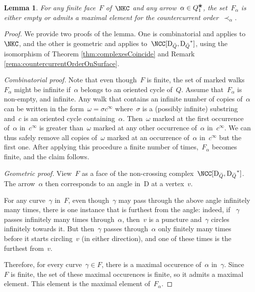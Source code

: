 \documentclass{amsart}
\newtheorem{lemma}[theorem]{Lemma}
\theoremstyle{definition}
\newcommand{\blossom}{^\text{\ding{96}}} %
\newcommand{\dual}{^*} %
\newcommand{\dissection}{\mathrm{D}} %
\begin{document}
\begin{lemma}
\label{lemm:facesHaveMaximalElement}
For any finite face~$F$ of~$\NKC$ and any arrow~$\alpha\in Q_1\blossom$, the set~$F_\alpha$ is either empty or admits a maximal element for the countercurrent order~$\prec_\alpha$.
\end{lemma}
\begin{proof}
 We provide two proofs of the lemma.  One is combinatorial and applies to~$\NKC$, and the other is geometric and applies to~$\NCC[\dissection_{\bar Q}, {\dissection_{\bar Q}}\dual]$, using the isomorphism of Theorem \ref{thm:complexesCoincide} and Remark \ref{rema:countercurrentOrderOnSurface}.
 
 {\it Combinatorial proof.}
 Note that even though~$F$ is finite, the set of marked walks~$F_\alpha$ might be infinite if~$\alpha$ belongs to an oriented cycle of~$Q$.
 Assume that~$F_\alpha$ is non-empty, and infinite.
 Any walk that contains an infinite number of copies of~$\alpha$ can be written in the form~$\omega=\sigma c^\infty$ where~$\sigma$ is a (possibly infinite) substring and~$c$ is an oriented cycle containing~$\alpha$.
 Then~$\omega$ marked at the first occurrence of~$\alpha$ in~$c^\infty$ is greater than~$\omega$ marked at any other occurrence of~$\alpha$ in~$c^\infty$.
 We can thus safely remove all copies of~$\omega$ marked at an occurrence of~$\alpha$ in~$c^\infty$ but the first one.
 After applying this procedure a finite number of times,~$F_\alpha$ becomes finite, and the claim follows.
 
 {\it Geometric proof.} View~$F$ as a face of the non-crossing complex~$\NCC[\dissection_{\bar Q}, {\dissection_{\bar Q}}\dual]$.
 The arrow~$\alpha$ then corresponds to an angle in~$\dissection$ at a vertex~$v$.  
 
 For any curve~$\gamma$ in~$F$, even though~$\gamma$ may pass through the above angle infinitely many times, there is one instance that is furthest from the angle:
 indeed, if ~$\gamma$ passes infinitely many times through~$\alpha$, then~$v$ is a puncture and~$\gamma$ circles infinitely towards it.
 But then~$\gamma$ passes through~$\alpha$ only finitely many times before it starts circling~$v$ (in either direction), and one of these times is the furthest from~$v$.
  
 Therefore, for every curve~$\gamma\in F$, there is a maximal occurence of~$\alpha$ in~$\gamma$.
 Since~$F$ is finite, the set of these maximal occurences is finite, so it admits a maximal element.  
 This element is the maximal element of~$F_\alpha$.
\end{proof}
\end{document}
